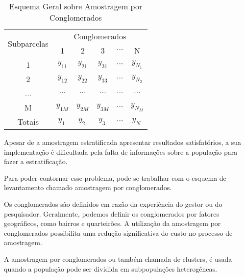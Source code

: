\begin{table}[!htb]
\centering
    {
    \caption{Esquema Geral sobre Amostragem por Conglomerados}
    \label{amostras estratificada}
    \vspace{0.1cm}
\begin{tabular}{c|c|c|c|c|c}
\hline\hline
\multirow{2}{*}{Subparcelas} & \multicolumn{5}{c}{Conglomerados}              \\
\cline{2-6}
                             & 1         & 2        &   3       & $\cdots$ & N            \\
\hline\hline
1                            & $y_{11}$  & $y_{21}$ &  $y_{31}$ & $\cdots$ & $y_{N_{1}}$  \\
2                            & $y_{12}$  & $y_{22}$ &  $y_{33}$ & $\cdots$ & $y_{N_{2}}$  \\
...                          & $\cdots$  & $\cdots$ &  $\cdots$ & $\cdots$ & $\cdots$     \\
M                            & $y_{1M}$  & $y_{2M}$ &  $y_{3M}$ & $\cdots$ & $y_{N_{M}}$   \\
\hline\hline
Totais                       &  $y_{1.}$ & $y_{2.}$ &  $y_{3.}$ &   $\cdots$       & $y_{N.}$   \\
\hline\hline
\end{tabular}}
\end{table}














\inic Apesar de a amostragem estratificada apresentar resultados
satisfatórios, a sua implementação é dificultada pela falta
de informações sobre a população para fazer a estratificação.\vskip0.3cm

Para poder contornar esse problema, pode-se trabalhar com o
esquema de levantamento chamado amostragem por conglomerados.\vskip0.3cm

Os conglomerados são definidos em razão da experiência
do gestor ou do pesquisador. Geralmente, podemos definir os
conglomerados por fatores geográficos, como bairros e quarteirões.
A utilização da amostragem por conglomerados possibilita uma
redução significativa do custo no processo de amostragem.\vskip0.3cm

A amostragem por conglomerados ou também chamada de clusters, é usada quando a população
pode ser dividida em subpopulações heterogêneas.\vskip0.3cm

